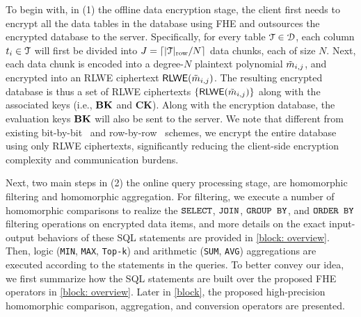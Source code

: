
To begin with,  in (1) the offline data encryption stage, 
the client first needs to encrypt all the data tables in the database 
using FHE and outsources the encrypted database to the server. 
Specifically, for every table $\mathcal{T}\in\mathcal{D}$, each column $t_i\in\mathcal{T}$ 
will first be divided into $J=\lceil |\mathcal{T}|_{\rm row}/N\rceil$ data chunks,
each of size $N$. Next, 
each data chunk is encoded into a degree-$N$ plaintext polynomial ${\Tilde{m}}_{i, j}$, and 
encrypted into an RLWE ciphertext ${\mathsf{RLWE}}({\Tilde{m}}_{i, j})$. The resulting encrypted
database is thus a set of RLWE ciphertexts $\{{\mathsf{RLWE}}({\Tilde{m}}_{i, j})\}$ along
with the associated keys (i.e., ${\mathbf{BK}}$ and $\mathbf{CK}$).
Along with the encryption database, the evaluation keys ${\mathbf{BK}}$
will also be sent to the server.
We note that different from existing bit-by-bit~\cite{aphadb}
and row-by-row~\cite{heda} schemes, we encrypt the entire database using only RLWE
ciphertexts, significantly reducing the client-side encryption complexity and communication
burdens.


Next, two main steps in (2) the online query processing stage,
are homomorphic filtering and homomorphic aggregation. 
For filtering, we execute a number of homomorphic comparisons to
realize the $\texttt{SELECT}$, $\texttt{JOIN}$, $\texttt{GROUP BY}$, and $\texttt{ORDER BY}$ filtering 
operations on
encrypted data items, and more details on the exact input-output
behaviors of these SQL statements are provided in \cref{block: overview}. 
Then, logic 
(\texttt{MIN}, \texttt{MAX}, \texttt{Top-k})
and arithmetic (\texttt{SUM}, \texttt{AVG}) aggregations are executed
according to the statements in the queries. To better convey our idea,
we first summarize how the SQL statements are built over the proposed FHE 
operators in \cref{block: overview}. Later in \cref{block},
the proposed high-precision homomorphic comparison, aggregation,
and conversion operators are presented. %


